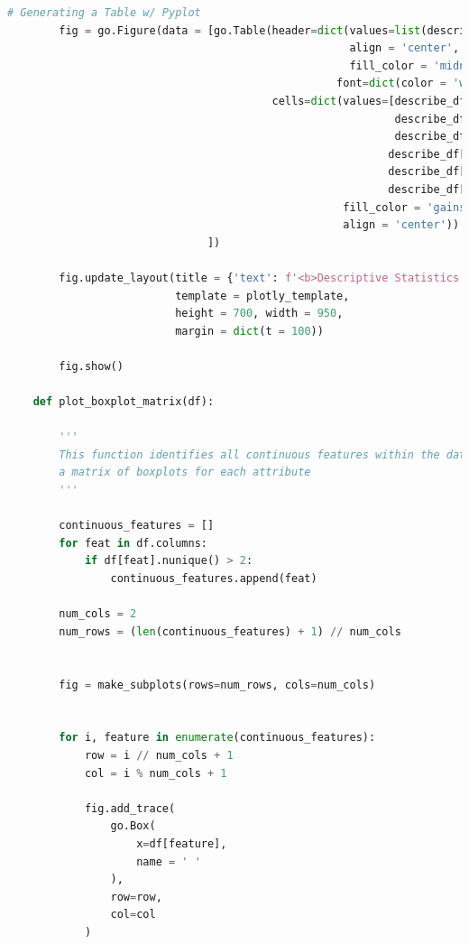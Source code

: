 \documentclass{apmcmthesis}
\begin{document}
\begin{lstlisting}[language=Python,caption={The Python Source code of Algorithm}]
        # Generating a Table w/ Pyplot
        fig = go.Figure(data = [go.Table(header=dict(values=list(describe_df.columns),
                                                     align = 'center',
                                                     fill_color = 'midnightblue',
                                                   font=dict(color = 'white', size = 18)),
                                         cells=dict(values=[describe_df['Feature Name'],
                                                            describe_df['Mean'],
                                                            describe_df['Standard Deviation'],
                                                           describe_df['25%'],
                                                           describe_df['Median'],
                                                           describe_df['75%']],
                                                    fill_color = 'gainsboro',
                                                    align = 'center'))
                               ])
    
        fig.update_layout(title = {'text': f'<b>Descriptive Statistics of the Dataframe<br><sup> (Mean, Standard Deviation, 25%, Median, and 75%)</sup></b>'},
                          template = plotly_template,
                          height = 700, width = 950,
                          margin = dict(t = 100))
    
        fig.show()
    
    def plot_boxplot_matrix(df):
        
        '''
        This function identifies all continuous features within the dataset and plots
        a matrix of boxplots for each attribute
        '''
        
        continuous_features = []
        for feat in df.columns:
            if df[feat].nunique() > 2:
                continuous_features.append(feat)
        
        num_cols = 2
        num_rows = (len(continuous_features) + 1) // num_cols
    
    
        fig = make_subplots(rows=num_rows, cols=num_cols)
    
    
        for i, feature in enumerate(continuous_features):
            row = i // num_cols + 1
            col = i % num_cols + 1
    
            fig.add_trace(
                go.Box(
                    x=df[feature],
                    name = ' '
                ),
                row=row,
                col=col
            )
    

\end{lstlisting}
\end{document}
